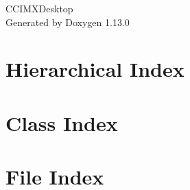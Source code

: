 \documentclass[twoside]{book}
\newcommand{\+}{\discretionary{\mbox{\scriptsize$\hookleftarrow$}}{}{}}
\newcommand{\clearemptydoublepage}{%
    \newpage{\pagestyle{empty}\cleardoublepage}%
  }
\begin{document}
  \raggedbottom
    \hypersetup{pageanchor=false,
                bookmarksnumbered=true,
                pdfencoding=unicode
               }
  \begin{titlepage}
  \vspace*{7cm}
  \begin{center}%
  {\Large CCIMXDesktop}\\
  \vspace*{1cm}
  {\large Generated by Doxygen 1.13.0}\\
  \end{center}
  \end{titlepage}
  \clearemptydoublepage
  \tableofcontents
  \clearemptydoublepage
  \hypersetup{pageanchor=true}




\chapter{Hierarchical Index}

\chapter{Class Index}

\chapter{File Index}

\end{document}
